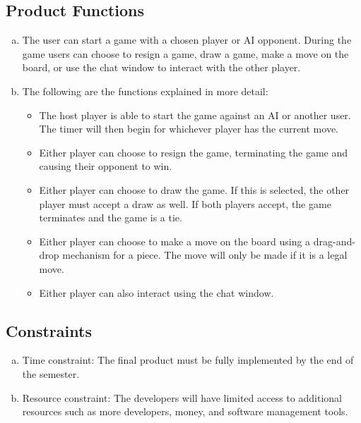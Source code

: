 \documentclass[]{article}
\begin{document}
\subsection{Product Functions}
\label{sub:product_functions}
\begin{enumerate}[a)]
	\item The user can start a game with a chosen player or AI opponent. During the game users can choose to resign a game, draw a game, make a move on the board, or use the chat window to interact with the other player.
	
	\item The following are the functions explained in more detail:
	\begin{itemize}
		\item The host player is able to start the game against an AI or another user. The timer will then begin for whichever player has the current move. 
		\item Either player can choose to resign the game, terminating the game and causing their opponent to win.
		\item Either player can choose to draw the game. If this is selected, the other player must accept a draw as well. If both players accept, the game terminates and the game is a tie.
	    \item Either player can choose to make a move on the board using a drag-and-drop mechanism for a piece. The move will only be made if it is a legal move.
	    \item Either player can also interact using the chat window.
	\end{itemize} 
\end{enumerate}

\subsection{Constraints}
\label{sub:constraints}
\begin{enumerate}[a)]
	\item Time constraint: The final product must be fully implemented by the end of the semester.
	\item Resource constraint: The developers will have limited access to additional resources such as more developers, money, and software management tools.
\end{enumerate}
\end{document}
